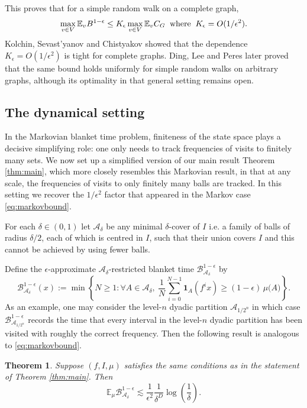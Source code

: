 \documentclass[11pt, reqno]{amsart}
\numberwithin{equation}{section}
\theoremstyle{plain}%
\newtheorem{thm}{Theorem}[section]
\theoremstyle{definition}
\def\B{\ensuremath{\mathcal B}}
\def\A{\ensuremath{\mathscr A}}
\renewcommand{\A}{\mathcal{A}}
\theoremstyle{nonumberplain}
\begin{document}
This proves that for a simple random walk on a complete graph,
\begin{equation}\label{eq:markovbound}
\max_{v \in V}\mathbb{E}_v B^{1-\epsilon}\leq K_\epsilon \max_{v \in V} \mathbb{E}_v C_G \;\; \textnormal{where} \; \; K_\epsilon=O(1/\epsilon^2).
\end{equation}
Kolchin, Sevast'yanov and Chistyakov \cite{kolchin} showed that the dependence $K_\epsilon=O(1/\epsilon^2)$ is tight for complete graphs. Ding, Lee and Peres later proved that the same bound holds uniformly for simple random walks on arbitrary graphs, although its optimality in that general setting remains open.

\subsection{The dynamical setting}

In the Markovian blanket time problem, finiteness of the state space plays a decisive simplifying role: one only needs to track frequencies of visits to finitely many sets. We now set up a simplified version of our main result Theorem \ref{thm:main}, which more closely resembles this Markovian result, in that at any scale, the frequencies of visits to only finitely many balls are tracked. In this setting we recover the $1/\epsilon^2$ factor that appeared in the Markov case \eqref{eq:markovbound}.


  For each $\delta \in (0,1)$ let $\A_\delta$ be any minimal $\delta$-cover of $I$ i.e. a family of balls of radius $\delta/2$, each of which is centred in $I$, such that their union covers $I$ and this cannot be achieved by using fewer balls. 

Define the $\epsilon$-approximate $\mathcal{A}_\delta$-restricted blanket time $ \B_{\A_\delta}^{1-\epsilon}$ by
\[
  \B_{\A_\delta}^{1-\epsilon}(x):=\min\left\{N \ge 1: 
      \forall A \in \A_\delta,\ 
      \frac{1}{N} \sum_{i=0}^{N-1} 
        \mathbf{1}_{A}(f^i x) 
      \geq (1-\epsilon)\,\mu\bigl(A\bigr)
  \right\}.
\]
As an example, one may consider the level-$n$ dyadic partition $\A_{1/2^n}$ in which case $\B_{\A_{1/2^n}}^{1-\epsilon}$ records the time that every interval in the level-$n$ dyadic partition has been visited with roughly the correct frequency.  Then the following result is analogous to \eqref{eq:markovbound}.



\begin{thm}\label{thm:easierproof}
Suppose $(f,I,\mu)$ satisfies the same conditions as in the statement of Theorem \ref{thm:main}. Then 
$$\mathbb{E}_\mu \B_{\A_\delta}^{1-\epsilon} \lesssim \frac{1}{\epsilon^2} \frac1{\delta^D}\log\left(\frac1\delta\right).$$
\end{thm}
\end{document}
